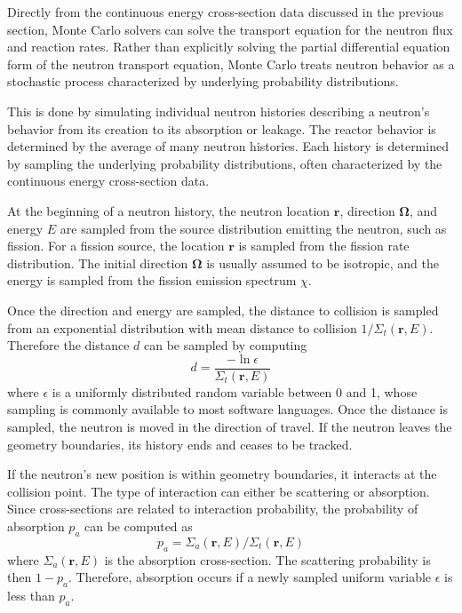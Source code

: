 Directly from the continuous energy cross-section data discussed in the previous section, Monte Carlo solvers can solve the transport equation for the neutron flux and reaction rates. Rather than explicitly solving the partial differential equation form of the neutron transport equation, Monte Carlo treats neutron behavior as a stochastic process characterized by underlying probability distributions.

This is done by simulating individual neutron histories describing a neutron's behavior from its creation to its absorption or leakage. The reactor behavior is determined by the average of many neutron histories. Each history is determined by sampling the underlying probability distributions, often characterized by the continuous energy cross-section data.

At the beginning of a neutron history, the neutron location $\mathbf{r}$, direction $\mathbf{\Omega}$, and energy $E$ are sampled from the source distribution emitting the neutron, such as fission. For a fission source, the location $\mathbf{r}$ is sampled from the fission rate distribution. The initial direction $\mathbf{\Omega}$ is usually assumed to be isotropic, and the energy is sampled from the fission emission spectrum $\chi$. 

Once the direction and energy are sampled, the distance to collision is sampled from an exponential distribution with mean distance to collision $1/\Sigma_{t}(\mathbf{r},E)$. Therefore the distance $d$ can be sampled by computing
\begin{equation}
d = \frac{-\ln{\epsilon}}{\Sigma_{t}(\mathbf{r},E)}
\end{equation}
where $\epsilon$ is a uniformly distributed random variable between 0 and 1, whose sampling is commonly available to most software languages. Once the distance is sampled, the neutron is moved in the direction of travel. If the neutron leaves the geometry boundaries, its history ends and ceases to be tracked.

If the neutron's new position is within geometry boundaries, it interacts at the collision point. The type of interaction can either be scattering or absorption. Since cross-sections are related to interaction probability, the probability of absorption $p_a$ can be computed as
\begin{equation}
	p_a = \Sigma_a(\mathbf{r},E) / \Sigma_{t}(\mathbf{r},E)
\end{equation}
where $\Sigma_a(\mathbf{r},E)$ is the absorption cross-section. The scattering probability is then $1-p_a$. Therefore, absorption occurs if a newly sampled uniform variable $\epsilon$ is less than $p_a$.

